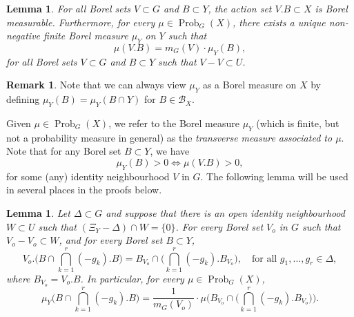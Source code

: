 \documentclass[12pt,reqno,a4paper]{amsart}
\numberwithin{equation}{section}
\DeclareMathOperator{\Prob}{Prob}
\theoremstyle{theorem}
\newtheorem{lemma}[theorem]{Lemma}
\theoremstyle{task}
\theoremstyle{definition}
\newtheorem{remark}[theorem]{Remark}
\begin{document}
\begin{lemma}
\label{Lemma_transmeas}
For all Borel sets $V \subset G$ and $B \subset Y$, the action set $V.B \subset X$
is Borel measurable. Furthermore, for every $\mu \in \Prob_G(X)$, there exists a \emph{unique} non-negative finite Borel measure $\mu_Y$ on $Y$ such that
\[
\mu(V.B) = m_G(V) \cdot \mu_Y(B), 
\]
for all Borel sets $V \subset G$ and $B \subset Y$ such that $V-V \subset U$.
\end{lemma}

\begin{remark}
Note that we can always view $\mu_Y$ as a Borel measure on $X$ by defining $\mu_Y(B) = \mu_Y(B \cap Y)$
for $B \in \mathscr{B}_X$.
\end{remark}

Given $\mu \in \Prob_G(X)$, we refer to the Borel measure $\mu_Y$ (which is finite, but not a probability measure in general) as the \emph{transverse measure associated to $\mu$}. Note that for any Borel set $B \subset Y$, we have
\[
\mu_Y(B) > 0 \iff \mu(V.B) > 0, 
\]
for some (any) identity neighbourhood $V$ in $G$. The following lemma will be used in several places in the proofs below. 

\begin{lemma}
\label{Lemma_g1gr}
Let $\Delta \subset G$ and suppose that there is an open identity neighbourhood $W \subset U$ such that $(\Xi_Y - \Delta) \cap W = \{0\}$. For every Borel set $V_o$ in $G$ 
such that $V_o-V_o \subset W$, and for every Borel set $B \subset Y$, 
\[
V_o.\Big(B \cap \bigcap_{k=1}^r (-g_k).B\Big) = B_{V_o} \cap \Big( \bigcap_{k=1}^r (-g_k).B_{V_o}\Big), \quad \textrm{for all $g_1,\ldots,g_r \in \Delta$},
\]
where $B_{V_o} = V_o.B$. In particular, for every $\mu \in \Prob_G(X)$, 
\[
\mu_Y\Big( B \cap \bigcap_{k=1}^r (-g_k).B\Big)
= \frac{1}{m_G(V_o)} \cdot \mu\Big(B_{V_o} \cap \Big( \bigcap_{k=1}^r (-g_k).B_{V_o}\Big)\Big).
\]
\end{lemma}
\end{document}
